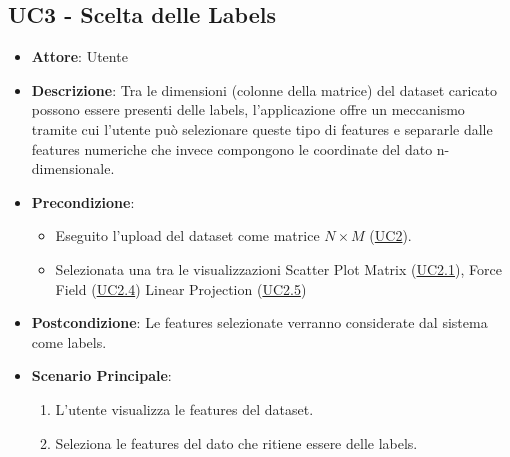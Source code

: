 \subsection{UC3 - Scelta delle Labels}
\label{uc3}
    \begin{itemize}
    \item \textbf{Attore}: Utente
    \item \textbf{Descrizione}: Tra le dimensioni (colonne della matrice) del dataset caricato possono essere presenti delle labels, l'applicazione offre un meccanismo tramite cui l'utente può selezionare queste tipo di features e separarle dalle features numeriche che invece compongono le coordinate del dato n-dimensionale.
    \item \textbf{Precondizione}:
    \begin{itemize}
        \item Eseguito l'upload del dataset come matrice $N\times M$ (\hyperref[uc2]{UC2}).
        \item Selezionata una tra le visualizzazioni Scatter Plot Matrix (\hyperref[uc2.1]{UC2.1}), Force Field (\hyperref[uc2.4]{UC2.4}) Linear Projection (\hyperref[uc2.5]{UC2.5})
    \end{itemize}
    \item \textbf{Postcondizione}: Le features selezionate verranno considerate dal sistema come labels.
    \item \textbf{Scenario Principale}: 
    \begin{enumerate}
        \item L'utente visualizza le features del dataset.
        \item Seleziona le features del dato che ritiene essere delle labels.
    \end{enumerate}  
    \end{itemize}
    
